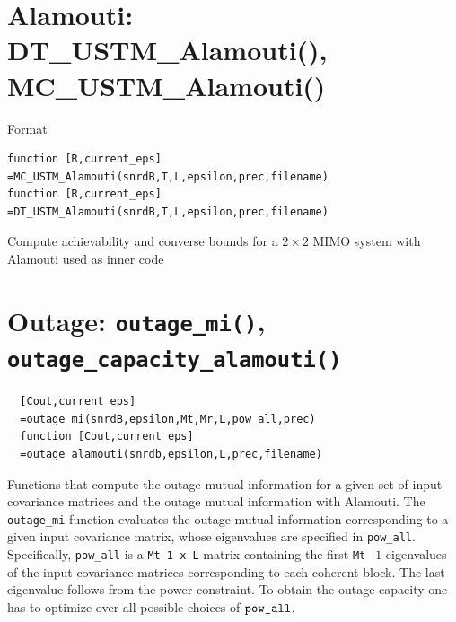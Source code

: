 \documentclass[a4paper,11p]{memoir}
\begin{document}
\section{Alamouti: DT\_USTM\_Alamouti(), MC\_USTM\_Alamouti()} %
\label{sec:alamouti}

Format

\begin{verbatim}
function [R,current_eps]
=MC_USTM_Alamouti(snrdB,T,L,epsilon,prec,filename)
function [R,current_eps]
=DT_USTM_Alamouti(snrdB,T,L,epsilon,prec,filename)
\end{verbatim}

Compute achievability and converse bounds for a $2\times 2$ MIMO system with Alamouti used as inner code


\section{Outage: \texttt{outage\_mi()}, \texttt{outage\_capacity\_alamouti()} } %
\label{sec:outage}

\begin{verbatim}
  [Cout,current_eps]
  =outage_mi(snrdB,epsilon,Mt,Mr,L,pow_all,prec)  
  function [Cout,current_eps]
  =outage_alamouti(snrdb,epsilon,L,prec,filename)  
\end{verbatim}

Functions that compute the outage mutual information for a given set of input covariance matrices and the outage mutual information with Alamouti. 
The \verb|outage_mi| function evaluates the outage mutual information corresponding to a given input covariance matrix, whose eigenvalues are specified in \verb|pow_all|. Specifically, \verb|pow_all| is a \verb|Mt-1 x L| matrix containing the
first \verb|Mt|$-1$ eigenvalues of the input covariance matrices corresponding to each coherent block. The last eigenvalue follows from the power constraint. To obtain the outage capacity one has to optimize over all possible choices of $\verb|pow_all|$.






\end{document}
